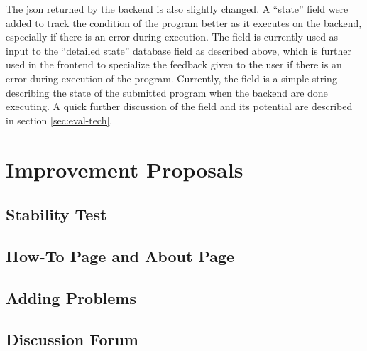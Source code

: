 The \gls{json} returned by the backend is also slightly changed. A ``state'' field were added to track the condition of the program better as it executes on the backend, especially if there is an error during execution. The field is currently used as input to the ``detailed state'' database field as described above, which is further used in the frontend to specialize the feedback given to the user if there is an error during execution of the program. Currently, the field is a simple string describing the state of the submitted program when the backend are done executing. A quick further discussion of the field and its potential are described in section \ref{sec:eval-tech}.

\section{Improvement Proposals}

\subsection{Stability Test}

\subsection{How-To Page and About Page}

\subsection{Adding Problems}

\subsection{Discussion Forum}
